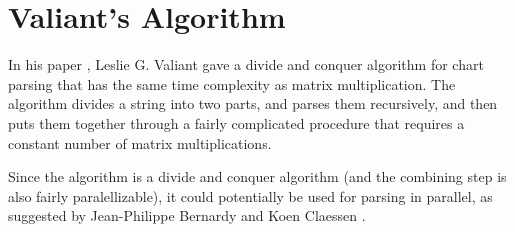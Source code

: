 \section{Valiant's Algorithm}
In his paper \cite{Valiant}, Leslie G. Valiant gave a divide and conquer algorithm for chart parsing that has the same time complexity as matrix multiplication. The algorithm divides a string into two parts, and parses them recursively, and then puts them together through a fairly complicated procedure that requires a constant number of matrix multiplications.

Since the algorithm is a divide and conquer algorithm (and the combining step is also fairly paralellizable), it could potentially be used for parsing in parallel, as suggested by Jean-Philippe Bernardy and Koen Claessen \cite{JP-PP}. 

